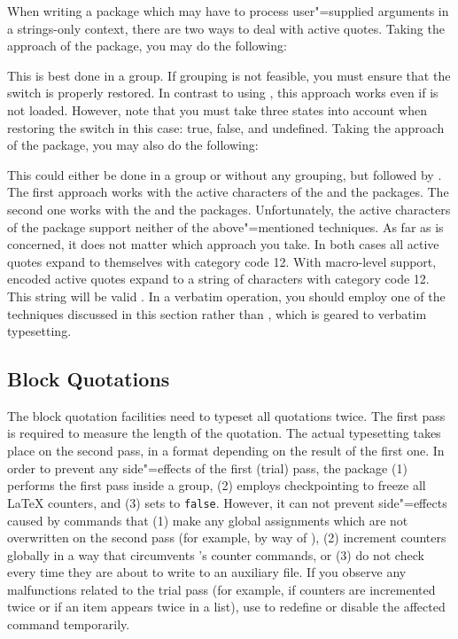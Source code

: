 \documentclass{ltxdockit}[2010/09/26]
\begin{document}
When writing a package which may have to process user"=supplied arguments in a strings-only context, there are two ways to deal with active quotes. Taking the approach of the  package, you may do the following:

\begin{ltxcode}
\let\if@safe@actives\iftrue
\end{ltxcode}
%
This is best done in a group. If grouping is not feasible, you must ensure that the switch is properly restored. In contrast to using , this approach works even if  is not loaded. However, note that you must take three states into account when restoring the switch in this case: true, false, and undefined. Taking the approach of the  package, you may also do the following:

\begin{ltxcode}
\let\@@protect\protect \let\protect\string
\end{ltxcode}
%
This could either be done in a group or without any grouping, but followed by . The first approach works with the active characters of the  and the  packages. The second one works with the  and the  packages. Unfortunately, the active characters of the  package support neither of the above"=mentioned techniques. As far as  is concerned, it does not matter which approach you take. In both cases all active quotes expand to themselves with category code 12. With macro-level \utf support, \utf encoded active quotes expand to a string of characters with category code 12. This string will be valid \utf. In a verbatim  operation, you should employ one of the techniques discussed in this section rather than , which is geared to verbatim typesetting.

\subsection{Block Quotations}
\label{aut:blk}

The block quotation facilities need to typeset all quotations twice. The first pass is required to measure the length of the quotation. The actual typesetting takes place on the second pass, in a format depending on the result of the first one. In order to prevent any side"=effects of the first (trial) pass, the  package (1) performs the first pass inside a group, (2) employs checkpointing to freeze all LaTeX counters, and (3) sets  to \texttt{false}. However, it can not prevent side"=effects caused by commands that (1) make any global assignments which are not overwritten on the second pass (for example, by way of ), (2) increment counters globally in a way that circumvents \latex's counter commands, or (3) do not check  every time they are about to write to an auxiliary file. If you observe any malfunctions related to the trial pass (for example, if counters are incremented twice or if an item appears twice in a list), use  to redefine or disable the affected command temporarily.
\end{document}
